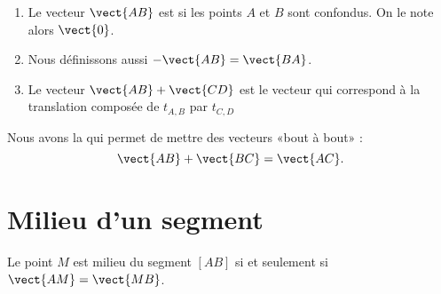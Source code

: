 \begin{definition}
    \begin{enumerate}
        \item
    Le vecteur \( \vect{ AB }\) est  si les points \( A\) et \( B\) sont confondus. On le note alors \( \vect{ 0 }\).

        \item
    Nous définissons aussi \( -\vect{ AB }=\vect{ BA }\).

\item

    Le vecteur  \( \vect{ AB }+\vect{ CD }\) est le vecteur qui correspond à la translation composée de \( t_{A,B}\) par \( t_{C,D}\)
    \end{enumerate}
\end{definition}

\begin{Aretenir}
    \begin{multicols}{2}
    Nous avons la  qui permet de mettre des vecteurs «bout à bout» :
    \begin{equation}
        \vect{ AB }+\vect{ BC }=\vect{ AC }.
    \end{equation}

    \columnbreak



    \end{multicols}
\end{Aretenir}

\section{Milieu d'un segment}

\begin{propriete}\label{PropFHznUfJ}
    \begin{multicols}{2}

        Le point \( M\) est milieu du segment \( [AB]\) si et seulement si \( \vect{ AM }=\vect{ MB }\).

        \columnbreak



    \end{multicols}
\end{propriete}

